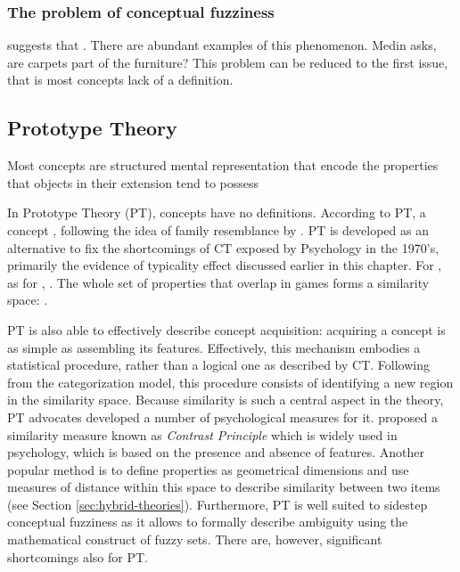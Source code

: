 \subsubsection*{The problem of conceptual fuzziness}
\cite{Medin1989} suggests that . There are abundant examples of this phenomenon. Medin asks, are carpets part of the furniture? This problem can be reduced to the first issue, that is most concepts lack of a definition.


\subsection{Prototype Theory}
\begin{mycolorbox}
	Most concepts are structured mental representation that encode the properties that objects in their extension tend to possess
\end{mycolorbox}

In Prototype Theory (PT), concepts have no definitions. According to PT, a concept , following the idea of family resemblance by \cite{Wittgenstein1953}. PT is developed as an alternative to fix the shortcomings of CT exposed by Psychology in the 1970's, primarily the evidence of typicality effect discussed earlier in this chapter. For \cite{Wittgenstein1953}, as for \cite{Rosch1975}, . The whole set of properties that overlap in games forms a similarity space: .

PT is also able to effectively describe concept acquisition: acquiring a concept is as simple as assembling its features. Effectively, this mechanism embodies a statistical procedure, rather than a logical one as described by CT. Following from the categorization model, this procedure consists of identifying a new region in the similarity space. Because similarity is such a central aspect in the theory, PT advocates developed a number of psychological measures for it. \cite{Tversky1977} proposed a similarity measure known as \emph{Contrast Principle} which is widely used in psychology, which is based on the presence and absence of features. Another popular method is to define properties as geometrical dimensions and use measures of distance within this space to describe similarity between two items (see Section \ref{sec:hybrid-theories}). Furthermore, PT is well suited to sidestep conceptual fuzziness as it allows to formally describe ambiguity using the mathematical construct of fuzzy sets. There are, however, significant shortcomings also for PT.

